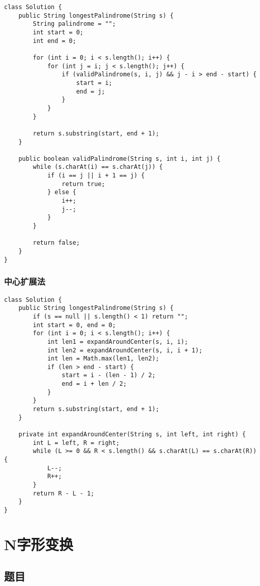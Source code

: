 \documentclass[oneside]{ctexbook}
\begin{document}
\begin{verbatim}
class Solution {
    public String longestPalindrome(String s) {
        String palindrome = "";
        int start = 0;
        int end = 0;

        for (int i = 0; i < s.length(); i++) {
            for (int j = i; j < s.length(); j++) {
                if (validPalindrome(s, i, j) && j - i > end - start) {
                    start = i;
                    end = j;
                }
            }
        }

        return s.substring(start, end + 1);
    }

    public boolean validPalindrome(String s, int i, int j) {
        while (s.charAt(i) == s.charAt(j)) {
            if (i == j || i + 1 == j) {
                return true;
            } else {
                i++;
                j--;
            }
        }

        return false;
    }
}
\end{verbatim}

\subsection{中心扩展法}

\begin{verbatim}
class Solution {
    public String longestPalindrome(String s) {
        if (s == null || s.length() < 1) return "";
        int start = 0, end = 0;
        for (int i = 0; i < s.length(); i++) {
            int len1 = expandAroundCenter(s, i, i);
            int len2 = expandAroundCenter(s, i, i + 1);
            int len = Math.max(len1, len2);
            if (len > end - start) {
                start = i - (len - 1) / 2;
                end = i + len / 2;
            }
        }
        return s.substring(start, end + 1);
    }

    private int expandAroundCenter(String s, int left, int right) {
        int L = left, R = right;
        while (L >= 0 && R < s.length() && s.charAt(L) == s.charAt(R)) {
            L--;
            R++;
        }
        return R - L - 1;
    }
}
\end{verbatim}

\chapter{N字形变换}

\section{题目}
\end{document}
